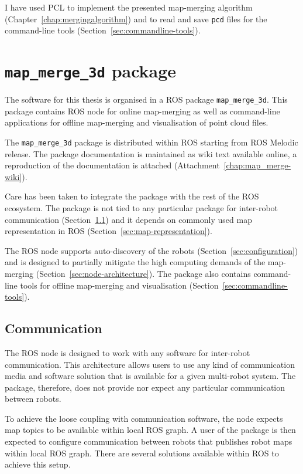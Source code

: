 I have used \gls{PCL} to implement the presented map-merging algorithm (Chapter~\ref{chap:mergingalgorithm}) and to read and save \texttt{pcd} files for the command-line tools (Section~\ref{sec:commandline-tools}).


\section{\texttt{map\_merge\_3d} package}
\label{sec:ros-package}

The software for this thesis is organised in a \gls{ROS} package \texttt{map\_merge\_3d}. This package contains \gls{ROS} node for online map-merging as well as command-line applications for offline map-merging and visualisation of point cloud files.

The \texttt{map\_merge\_3d} package is distributed within \gls{ROS} starting from \gls{ROS} Melodic release. The package documentation is maintained as wiki text available online, a reproduction of the documentation is attached (Attachment~\ref{chap:map_merge-wiki}).

Care has been taken to integrate the package with the rest of the \gls{ROS} ecosystem. The package is not tied to any particular package for inter-robot communication (Section~\ref{sec:communication}) and it depends on commonly used map representation in \gls{ROS} (Section~\ref{sec:map-representation}).

The \gls{ROS} node supports auto-discovery of the robots (Section~\ref{sec:configuration}) and is designed to partially mitigate the high computing demands of the map-merging (Section~\ref{sec:node-architecture}). The package also contains command-line tools for offline map-merging and visualisation (Section~\ref{sec:commandline-tools}).

\subsection{Communication}
\label{sec:communication}

The \gls{ROS} node is designed to work with any software for inter-robot communication. This architecture allows users to use any kind of communication media and software solution that is available for a given multi-robot system. The package, therefore, does not provide nor expect any particular communication between robots.

To achieve the loose coupling with communication software, the node expects map topics to be available within local \gls{ROS} graph. A user of the package is then expected to configure communication between robots that publishes robot maps within local \gls{ROS} graph. There are several solutions available within \gls{ROS} to achieve this setup.

